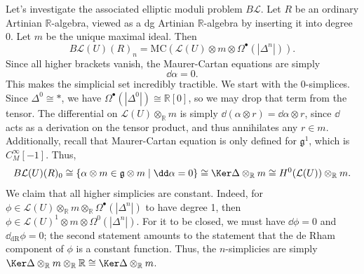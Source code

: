 Let's investigate the associated elliptic moduli problem $B\mathcal{L} $. Let $R$ be an ordinary Artinian $\mathbb{R} $-algebra, viewed as a dg Artinian $\mathbb{R} $-algebra by inserting it into degree 0. Let $m$ be the unique maximal ideal. Then
\[
	B\mathcal{L} (U)(R)_n = \mathrm{MC}(\mathcal{L} (U)\otimes m \otimes \Omega ^{\bullet} (\left| \Delta ^n \right| ))
.\]
Since all higher brackets vanish, the Maurer-Cartan equations are simply
\[
	\dd \alpha =0
.\]
This makes the simplicial set incredibly tractible. We start with the 0-simplices. Since $\Delta ^0 \cong *$, we have $\Omega ^{\bullet} (\left| \Delta ^0 \right| ) \cong \mathbb{R} [0]$, so we may drop that term from the tensor. The differential on $\mathcal{L} (U)\otimes _{\mathbb{R} } m$ is simply $\dd (\alpha \otimes r) = \dd \alpha \otimes r$, since $\dd $ acts as a derivation on the tensor product, and thus annihilates any $r\in m$. Additionally, recall that Maurer-Cartan equation is only defined for $\mathfrak{g} ^1$, which is $C^\infty _M[-1]$. Thus,
\[
	B\mathcal{L} (U)(R)_0 \cong \left\{ \alpha \otimes m\in \mathfrak{g} \otimes m\mid \dd \alpha = 0 \right\} \cong \Ker \Delta \otimes_{\mathbb{R} } m \cong H^0(\mathcal{L} (U))\otimes _{\mathbb{R} } m
.\]
We claim that all higher simplicies are constant. Indeed, for $\phi \in \mathcal{L} (U)\otimes_{\mathbb{R} } m\otimes _{\mathbb{R} } \Omega ^{\bullet} (\left| \Delta ^n \right| )$ to have degree 1, then $\phi \in \mathcal{L} (U)^1 \otimes m\otimes \Omega ^0(\left| \Delta ^n \right| )$. For it to be closed, we must have $\dd \phi =0$ and $\dd _{\mathrm{dR} } \phi =0$; the second statement amounts to the statement that the de Rham component of $\phi $ is a constant function. Thus, the $n$-simplicies are simply $\Ker \Delta \otimes _{\mathbb{R} } m\otimes _{\mathbb{R} } \mathbb{R} \cong \Ker \Delta \otimes _{\mathbb{R} } m$.
